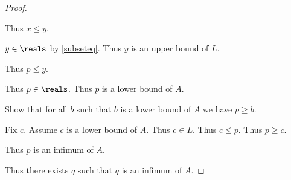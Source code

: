 \begin{proof}
\begin{subproof}
\begin{subproof}
\begin{subproof}
\begin{subproof}
\begin{subproof}
                        Thus $x \leq y$.
                    \end{subproof}
                    $y\in\reals$ by \cref{subseteq}.
                    Thus $y$ is an upper bound of $L$.
                \end{subproof}
                Thus $p \leq y$.
            \end{subproof}
            Thus $p\in\reals$.
            Thus $p$ is a lower bound of $A$.
        \end{subproof}
        Show that for all $b$ such that $b$ is a lower bound of $A$ we have $p \geq b$.
        \begin{subproof}
            Fix $c$.
            Assume $c$ is a lower bound of $A$.
            Thus $c\in L$.
            Thus $c \leq p$.
            Thus $p \geq c$.
        \end{subproof}
        Thus $p$ is an infimum of $A$.
    \end{subproof}
    Thus there exists $q$ such that $q$ is an infimum of $A$.
\end{proof}

